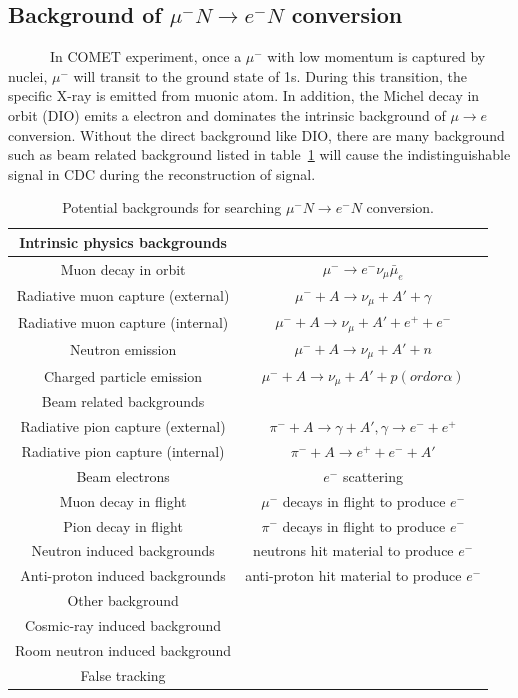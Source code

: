 \subsection{Background of $\mu^-N \rightarrow e^-N$ conversion}
~~~~~~In COMET experiment, once a $\mu^-$ with low momentum is captured by nuclei, $\mu^-$ will transit to the ground state of 1s.
During this transition, the specific X-ray is emitted from muonic atom.
In addition, the Michel decay in orbit (DIO) emits a electron and dominates the intrinsic background of $\mu \rightarrow e$ conversion.
Without the direct background like DIO, there are many background such as beam related background listed in table~\ref{backg} will cause the indistinguishable signal in CDC during the reconstruction of signal.
\begin{table}[H]
 \centering
 \begin{tabular}{cc} \hline \hline
  Intrinsic physics backgrounds & \\ \hline
  Muon decay in orbit & $\mu^- \rightarrow e^-\nu_\mu\bar\mu_e$ \\
  Radiative muon capture (external) & $\mu^- + A \rightarrow \nu_\mu + A' + \gamma$ \\
  Radiative muon capture (internal) & $\mu^- + A \rightarrow \nu_\mu + A' + e^+ + e^-$ \\
  Neutron emission & $\mu^- + A \rightarrow \nu_\mu + A' + n$ \\
  Charged particle emission & $\mu^- + A \rightarrow \nu_\mu + A' + p (or d or \alpha)$ \\ \hline
  Beam related backgrounds & \\ \hline
  Radiative pion capture (external) & $\pi^- + A \rightarrow \gamma + A', \gamma \rightarrow e^- + e^+$ \\
  Radiative pion capture (internal) & $\pi^- + A \rightarrow e^+ + e^- + A'$ \\
  Beam electrons & $e^-$ scattering \\
  Muon decay in flight & $\mu^-$ decays in flight to produce $e^-$ \\
  Pion decay in flight & $\pi^-$ decays in flight to produce $e^-$ \\
  Neutron induced backgrounds & neutrons hit material to produce $e^-$ \\
  Anti-proton induced backgrounds & anti-proton hit material to produce $e^-$ \\ \hline
  Other background & \\ \hline
  Cosmic-ray induced background & \\
  Room neutron induced background & \\
  False tracking \\ \hline \hline
 \end{tabular}
 \caption{Potential backgrounds for searching $\mu^-N \rightarrow e^-N$ conversion.}
 \label{backg}
\end{table}

